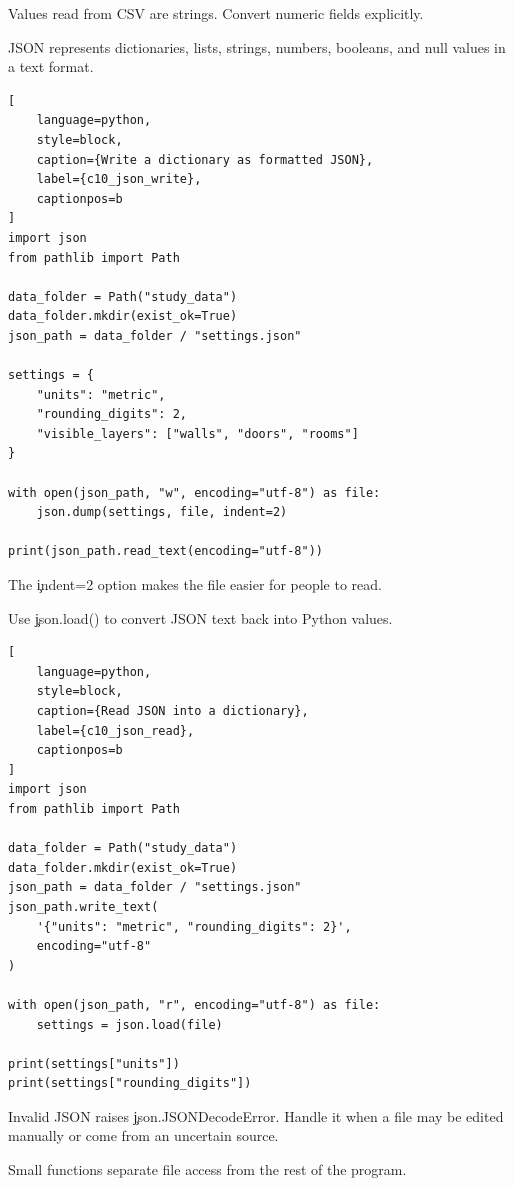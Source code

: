 Values read from CSV are strings. Convert numeric fields explicitly.


JSON represents dictionaries, lists, strings, numbers, booleans, and null
values in a text format.

\begin{lstlisting}[
    language=python,
    style=block,
    caption={Write a dictionary as formatted JSON},
    label={c10_json_write},
    captionpos=b
]
import json
from pathlib import Path

data_folder = Path("study_data")
data_folder.mkdir(exist_ok=True)
json_path = data_folder / "settings.json"

settings = {
    "units": "metric",
    "rounding_digits": 2,
    "visible_layers": ["walls", "doors", "rooms"]
}

with open(json_path, "w", encoding="utf-8") as file:
    json.dump(settings, file, indent=2)

print(json_path.read_text(encoding="utf-8"))
\end{lstlisting}

The \c{indent=2} option makes the file easier for people to read.


Use \c{json.load()} to convert JSON text back into Python values.

\begin{lstlisting}[
    language=python,
    style=block,
    caption={Read JSON into a dictionary},
    label={c10_json_read},
    captionpos=b
]
import json
from pathlib import Path

data_folder = Path("study_data")
data_folder.mkdir(exist_ok=True)
json_path = data_folder / "settings.json"
json_path.write_text(
    '{"units": "metric", "rounding_digits": 2}',
    encoding="utf-8"
)

with open(json_path, "r", encoding="utf-8") as file:
    settings = json.load(file)

print(settings["units"])
print(settings["rounding_digits"])
\end{lstlisting}

Invalid JSON raises \c{json.JSONDecodeError}. Handle it when a file may be
edited manually or come from an uncertain source.


Small functions separate file access from the rest of the program.

